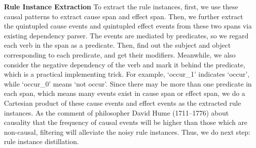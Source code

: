 



\textbf{Rule Instance Extraction}
To extract the rule instances,
first, we use these causal patterns to extract cause span and effect span.
Then, we further extract the quintupled cause events and quintupled effect events from these two spans via existing dependency parser.
The events are mediated by predicates, so we regard each verb in the span as a predicate. 
Then, find out the subject and object corresponding to each predicate, and get their modifiers. Meanwhile, we also consider the negative dependency of the verb and mark it behind the predicate, which is a practical implementing trick. 
For example, `occur\_1' indicates `occur', while `occur\_0' means `not occur'. 
Since there may be more than one predicate in each span, which means many events exist in cause span or effect span, we do a Cartesian product of these cause events and effect events as the extracted rule instances. As the comment of philosopher David Hume (1711–1776) about causality that the frequency of causal events will be higher than those which are non-causal, filtering will alleviate the noisy rule instances. Thus, we do next step: rule instance distillation.


